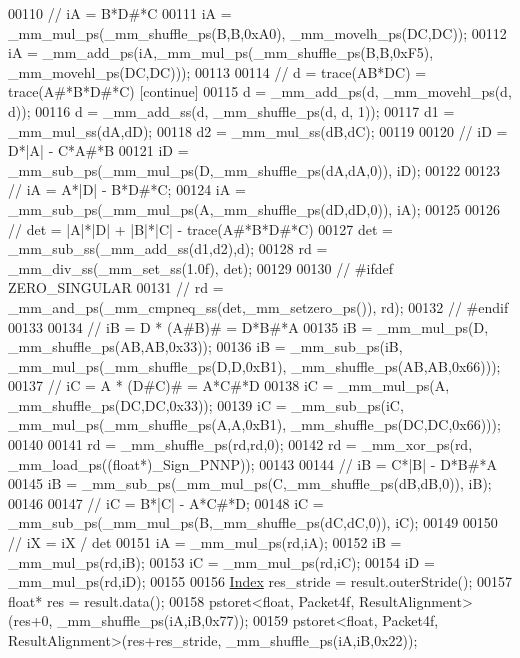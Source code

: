 \begin{DoxyCode}
00110     \textcolor{comment}{//  iA = B*D#*C}
00111     iA = \_mm\_mul\_ps(\_mm\_shuffle\_ps(B,B,0xA0), \_mm\_movelh\_ps(DC,DC));
00112     iA = \_mm\_add\_ps(iA,\_mm\_mul\_ps(\_mm\_shuffle\_ps(B,B,0xF5), \_mm\_movehl\_ps(DC,DC)));
00113 
00114     \textcolor{comment}{//  d = trace(AB*DC) = trace(A#*B*D#*C) [continue]}
00115     d  = \_mm\_add\_ps(d, \_mm\_movehl\_ps(d, d));
00116     d  = \_mm\_add\_ss(d, \_mm\_shuffle\_ps(d, d, 1));
00117     d1 = \_mm\_mul\_ss(dA,dD);
00118     d2 = \_mm\_mul\_ss(dB,dC);
00119 
00120     \textcolor{comment}{//  iD = D*|A| - C*A#*B}
00121     iD = \_mm\_sub\_ps(\_mm\_mul\_ps(D,\_mm\_shuffle\_ps(dA,dA,0)), iD);
00122 
00123     \textcolor{comment}{//  iA = A*|D| - B*D#*C;}
00124     iA = \_mm\_sub\_ps(\_mm\_mul\_ps(A,\_mm\_shuffle\_ps(dD,dD,0)), iA);
00125 
00126     \textcolor{comment}{//  det = |A|*|D| + |B|*|C| - trace(A#*B*D#*C)}
00127     det = \_mm\_sub\_ss(\_mm\_add\_ss(d1,d2),d);
00128     rd  = \_mm\_div\_ss(\_mm\_set\_ss(1.0f), det);
00129 
00130 \textcolor{comment}{//     #ifdef ZERO\_SINGULAR}
00131 \textcolor{comment}{//         rd = \_mm\_and\_ps(\_mm\_cmpneq\_ss(det,\_mm\_setzero\_ps()), rd);}
00132 \textcolor{comment}{//     #endif}
00133 
00134     \textcolor{comment}{//  iB = D * (A#B)# = D*B#*A}
00135     iB = \_mm\_mul\_ps(D, \_mm\_shuffle\_ps(AB,AB,0x33));
00136     iB = \_mm\_sub\_ps(iB, \_mm\_mul\_ps(\_mm\_shuffle\_ps(D,D,0xB1), \_mm\_shuffle\_ps(AB,AB,0x66)));
00137     \textcolor{comment}{//  iC = A * (D#C)# = A*C#*D}
00138     iC = \_mm\_mul\_ps(A, \_mm\_shuffle\_ps(DC,DC,0x33));
00139     iC = \_mm\_sub\_ps(iC, \_mm\_mul\_ps(\_mm\_shuffle\_ps(A,A,0xB1), \_mm\_shuffle\_ps(DC,DC,0x66)));
00140 
00141     rd = \_mm\_shuffle\_ps(rd,rd,0);
00142     rd = \_mm\_xor\_ps(rd, \_mm\_load\_ps((\textcolor{keywordtype}{float}*)\_Sign\_PNNP));
00143 
00144     \textcolor{comment}{//  iB = C*|B| - D*B#*A}
00145     iB = \_mm\_sub\_ps(\_mm\_mul\_ps(C,\_mm\_shuffle\_ps(dB,dB,0)), iB);
00146 
00147     \textcolor{comment}{//  iC = B*|C| - A*C#*D;}
00148     iC = \_mm\_sub\_ps(\_mm\_mul\_ps(B,\_mm\_shuffle\_ps(dC,dC,0)), iC);
00149 
00150     \textcolor{comment}{//  iX = iX / det}
00151     iA = \_mm\_mul\_ps(rd,iA);
00152     iB = \_mm\_mul\_ps(rd,iB);
00153     iC = \_mm\_mul\_ps(rd,iC);
00154     iD = \_mm\_mul\_ps(rd,iD);
00155 
00156     \hyperlink{namespace_eigen_a62e77e0933482dafde8fe197d9a2cfde}{Index} res\_stride = result.outerStride();
00157     \textcolor{keywordtype}{float}* res = result.data();
00158     pstoret<float, Packet4f, ResultAlignment>(res+0,            \_mm\_shuffle\_ps(iA,iB,0x77));
00159     pstoret<float, Packet4f, ResultAlignment>(res+res\_stride,   \_mm\_shuffle\_ps(iA,iB,0x22));

\end{DoxyCode}
